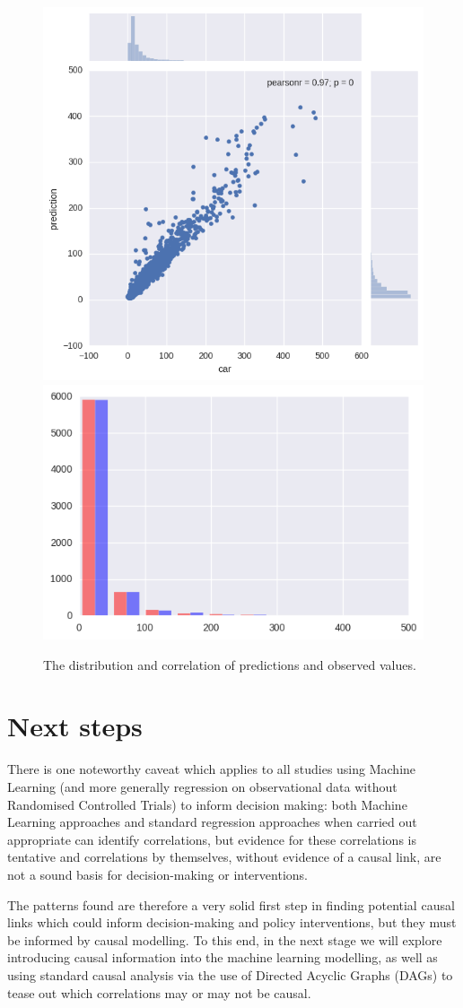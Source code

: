 \documentclass[11pt]{article}
\begin{document}
\begin{figure}

{\centering \includegraphics[width=0.49\linewidth]{../figures/xgb_pred_obs_correlation} \includegraphics[width=0.49\linewidth]{../figures/xgb_hist} 

}

\caption{The distribution and correlation of predictions and observed values.}\label{fig:unnamed-chunk-4}
\end{figure}

\section{Next steps}\label{next-steps}

There is one noteworthy caveat which applies to all studies using
Machine Learning (and more generally regression on observational data
without Randomised Controlled Trials) to inform decision making: both
Machine Learning approaches and standard regression approaches when
carried out appropriate can identify correlations, but evidence for
these correlations is tentative and correlations by themselves, without
evidence of a causal link, are not a sound basis for decision-making or
interventions.

The patterns found are therefore a very solid first step in finding
potential causal links which could inform decision-making and policy
interventions, but they must be informed by causal modelling. To this
end, in the next stage we will explore introducing causal information
into the machine learning modelling, as well as using standard causal
analysis via the use of Directed Acyclic Graphs (DAGs) to tease out
which correlations may or may not be causal.
\end{document}
